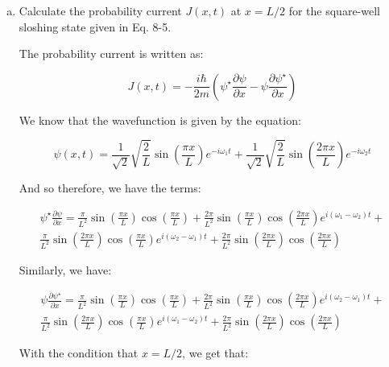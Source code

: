 \documentclass[10pt]{article}
\begin{document}
    \begin{enumerate}[(a)]
        \item Calculate the probability current $J(x, t)$ at $x = L/2$ for the square-well sloshing state given in Eq. 8-5.
        
        \begin{solution}
            The probability current is written as: 

            \[ J(x, t) = -\frac{i\hbar}{2m}\left( \psi^\star \frac{\partial\psi}{\partial x} - \psi \frac{\partial \psi^\star}{\partial x}\right)\] 

            We know that the wavefunction is given by the equation: 

            \[ \psi(x, t) = \frac{1}{\sqrt{2}}\sqrt{\frac{2}{L}} \sin\left( \frac{\pi x}{L}\right) e^{-i\omega_1t} + \frac{1}{\sqrt{2}}\sqrt{\frac{2}{L}} \sin \left( \frac{2\pi x}{L}\right)e^{-i\omega_2t}\] 

            And so therefore, we have the terms: 

            \begin{multline*}
                \psi^\star \frac{\partial \psi}{\partial x} = \frac{\pi}{L^2} \sin \left( \frac{\pi x}{L}\right) \cos \left( \frac{\pi x}{L}\right)+ \frac{2\pi}{L^2} \sin \left( \frac{\pi x}{L}\right) \cos\left( \frac{2\pi x}{L}\right)e^{i (\omega_1 - \omega_2)t} +\\ \frac{\pi }{L^2} \sin \left( \frac{2\pi x}{L}\right) \cos \left( \frac{\pi x}{L}\right) e^{i(\omega_2 - \omega_1)t} + \frac{2\pi}{L^2} \sin \left( \frac{2\pi x}{L}\right) \cos\left( \frac{2\pi x}{L}\right)
            \end{multline*}

            Similarly, we have:

            \begin{multline*}
                \psi \frac{\partial \psi^\star}{\partial x} = \frac{\pi}{L^2} \sin \left( \frac{\pi x}{L}\right) \cos \left( \frac{\pi x}{L}\right)+ \frac{2\pi}{L^2} \sin \left( \frac{\pi x}{L}\right) \cos\left( \frac{2\pi x}{L}\right)e^{i (\omega_2 - \omega_1)t} +\\ \frac{\pi }{L^2} \sin \left( \frac{2\pi x}{L}\right) \cos \left( \frac{\pi x}{L}\right) e^{i(\omega_1 - \omega_2)t} + \frac{2\pi}{L^2} \sin \left( \frac{2\pi x}{L}\right) \cos\left( \frac{2\pi x}{L}\right)
            \end{multline*} 

            With the condition that $x = L/2$, we get that: 


\end{solution}
\end{enumerate}
\end{document}
